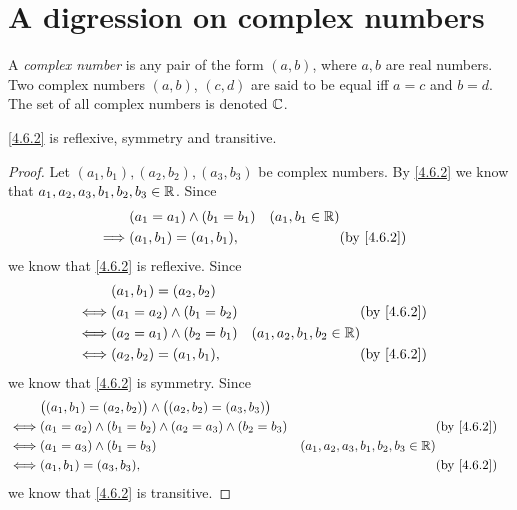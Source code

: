 \section{A digression on complex numbers}\label{sec:4.6}

\setcounter{thm}{1}
\begin{defn}\label{4.6.2}
  A \emph{complex number} is any pair of the form \((a, b)\), where \(a, b\) are real numbers.
  Two complex numbers \((a, b)\), \((c, d)\) are said to be equal iff \(a = c\) and \(b = d\).
  The set of all complex numbers is denoted \(\mathbb{C}\).
\end{defn}

\begin{ac}\label{ac:4.6.1}
  \cref{4.6.2} is reflexive, symmetry and transitive.
\end{ac}

\begin{proof}
  Let \((a_1, b_1), (a_2, b_2), (a_3, b_3)\) be complex numbers.
  By \cref{4.6.2} we know that \(a_1, a_2, a_3, b_1, b_2, b_3 \in \mathbb{R}\).
  Since
  \begin{align*}
             & (a_1 = a_1) \land (b_1 = b_1) & (a_1, b_1 \in \R)                            \\
    \implies & (a_1, b_1) = (a_1, b_1),      &                   & \text{(by \cref{4.6.2})}
  \end{align*}
  we know that \cref{4.6.2} is reflexive.
  Since
  \begin{align*}
         & (a_1, b_1) = (a_2, b_2)                                                                \\
    \iff & (a_1 = a_2) \land (b_1 = b_2) &                             & \text{(by \cref{4.6.2})} \\
    \iff & (a_2 = a_1) \land (b_2 = b_1) & (a_1, a_2, b_1, b_2 \in \R)                            \\
    \iff & (a_2, b_2) = (a_1, b_1),      &                             & \text{(by \cref{4.6.2})}
  \end{align*}
  we know that \cref{4.6.2} is symmetry.
  Since
  \begin{align*}
         & \big((a_1, b_1) = (a_2, b_2)\big) \land \big((a_2, b_2) = (a_3, b_3)\big)                                                                    \\
    \iff & (a_1 = a_2) \land (b_1 = b_2) \land (a_2 = a_3) \land (b_2 = b_3)         &                                       & \text{(by \cref{4.6.2})} \\
    \iff & (a_1 = a_3) \land (b_1 = b_3)                                             & (a_1, a_2, a_3, b_1, b_2, b_3 \in \R)                            \\
    \iff & (a_1, b_1) = (a_3, b_3),                                                  &                                       & \text{(by \cref{4.6.2})}
  \end{align*}
  we know that \cref{4.6.2} is transitive.
\end{proof}

